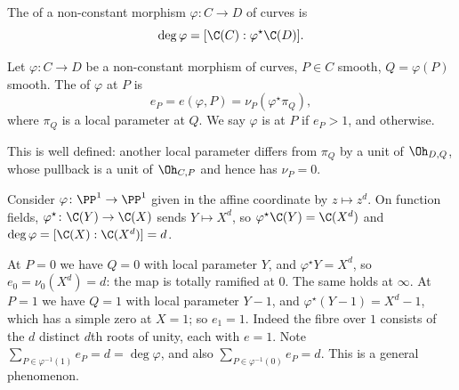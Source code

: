 \begin{definition}[Degree]
	The  of a non-constant morphism $\varphi \colon C \to D$ of curves is
	$$\deg\varphi = [\C(C) : \varphi^\star\C(D)].$$
\end{definition}

\begin{definition}[Ramification]
	Let $\varphi \colon C \to D$ be a non-constant morphism of curves, $P \in C$ smooth, $Q = \varphi(P)$ smooth. The  of $\varphi$ at $P$ is
	$$e_P = e(\varphi,P) = \nu_P(\varphi^\star\pi_Q),$$
	where $\pi_Q$ is a local parameter at $Q$. We say $\varphi$ is  at $P$ if $e_P > 1$, and  otherwise.
\end{definition}

This is well defined: another local parameter differs from $\pi_Q$ by a unit of $\Oh_{D,Q}$, whose pullback is a unit of $\Oh_{C,P}$ and hence has $\nu_P = 0$.

\begin{example}\label{ex:zd}
	Consider $\varphi \colon \PP^1\to\PP^1$ given in the affine coordinate by $z \mapsto z^d$. On function fields, $\varphi^\star \colon \C(Y) \to \C(X)$ sends $Y \mapsto X^d$, so $\varphi^\star\C(Y) = \C(X^d)$ and $\deg\varphi = [\C(X):\C(X^d)] = d$.

	At $P = 0$ we have $Q = 0$ with local parameter $Y$, and $\varphi^\star Y = X^d$, so $e_0 = \nu_0(X^d) = d$: the map is totally ramified at $0$. The same holds at $\infty$. At $P = 1$ we have $Q = 1$ with local parameter $Y-1$, and $\varphi^\star(Y-1) = X^d - 1$, which has a simple zero at $X = 1$; so $e_1 = 1$. Indeed the fibre over $1$ consists of the $d$ distinct $d$th roots of unity, each with $e = 1$. Note $\sum_{P \in \varphi^{-1}(1)} e_P = d = \deg\varphi$, and also $\sum_{P\in\varphi^{-1}(0)}e_P = d$. This is a general phenomenon.
\end{example}

